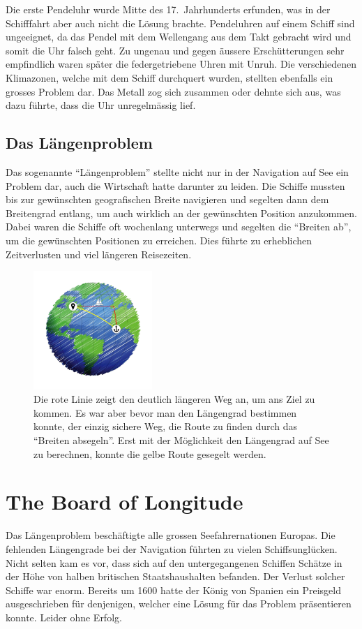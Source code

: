 \begin{refsection}
Die erste Pendeluhr wurde Mitte des 17.~Jahrhunderts erfunden, was
in der Schifffahrt aber auch nicht die Lösung brachte. Pendeluhren
auf einem Schiff sind ungeeignet, da das Pendel mit dem Wellengang
aus dem Takt gebracht wird und somit die Uhr falsch geht.
Zu ungenau und gegen äussere Erschütterungen sehr empfindlich waren
später die federgetriebene Uhren mit Unruh. Die verschiedenen
Klimazonen, welche mit dem Schiff durchquert wurden, stellten
ebenfalls ein grosses Problem dar. Das Metall zog sich zusammen
oder dehnte sich aus, was dazu führte, dass die Uhr unregelmässig
lief.

\subsection{Das Längenproblem}
Das sogenannte ``Längenproblem'' stellte nicht nur in der Navigation
auf See ein Problem dar, auch die Wirtschaft hatte darunter zu
leiden. Die Schiffe mussten bis zur gewünschten geografischen Breite
navigieren und segelten dann dem Breitengrad entlang, um auch
wirklich an der gewünschten Position anzukommen. Dabei waren die
Schiffe oft wochenlang unterwegs und segelten die ``Breiten ab'', um
die gewünschten Positionen zu erreichen. Dies führte zu erheblichen
Zeitverlusten und viel längeren Reisezeiten.


\begin{figure}[htbp]
\centering
\includegraphics[width=0.4\textwidth]{kugel/Breitensegeln.jpg}
\caption{Die rote Linie zeigt den deutlich längeren Weg an, um ans
Ziel zu kommen. Es war aber bevor man den Längengrad bestimmen
konnte, der einzig sichere Weg, die Route zu finden durch das
``Breiten absegeln''. Erst mit der Möglichkeit den Längengrad auf See
zu berechnen, konnte die gelbe Route gesegelt werden.}
\end{figure}

\section{The Board of Longitude}
%
Das Längenproblem beschäftigte alle grossen Seefahrernationen
Europas. Die fehlenden Längengrade bei der Navigation führten zu
vielen Schiffsunglücken. Nicht selten kam es vor, dass sich auf den
untergegangenen Schiffen Schätze in der Höhe von halben britischen
Staatshaushalten befanden. Der Verlust solcher Schiffe war enorm.
Bereits um 1600 hatte der König von Spanien ein Preisgeld ausgeschrieben
für denjenigen, welcher eine Lösung für das Problem präsentieren
konnte. Leider ohne Erfolg.


\end{refsection}
